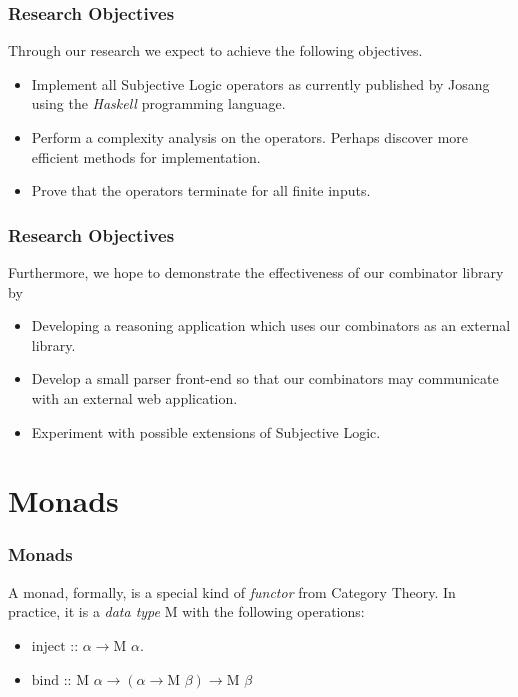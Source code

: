\documentclass{beamer}
\begin{document}

\begin{frame}
\frametitle{Research Objectives}

Through our research we expect to achieve the following objectives.

\begin{itemize}
  \item Implement all Subjective Logic operators as currently published by Josang
    using the \emph{Haskell} programming language.
  \item Perform a complexity analysis on the operators. Perhaps discover more efficient
    methods for implementation.
  \item Prove that the operators terminate for all finite inputs.
\end{itemize}

\end{frame}


\begin{frame}
\frametitle{Research Objectives}

Furthermore, we hope to demonstrate the effectiveness of our combinator
library by

\begin{itemize}
  \item Developing a reasoning application which uses our combinators as an
    external library.
  \item Develop a small parser front-end so that our combinators may communicate
    with an external web application.
  \item Experiment with possible extensions of Subjective Logic.
\end{itemize}

\end{frame}

%
%

\section{Monads}

\begin{frame}
\frametitle{Monads}

A monad, formally, is a special kind of \emph{functor} from Category Theory. In
practice, it is a \emph{data type} M with the following operations:

\begin{itemize}
  \item $\mbox{inject :: } \alpha \rightarrow \mbox{M } \alpha$.
  \item $\mbox{bind :: } \mbox{M } \alpha \rightarrow \left(\alpha \rightarrow \mbox{M } \beta\right) \rightarrow \mbox{M } \beta$

\end{itemize}

\end{frame}
\end{document}
